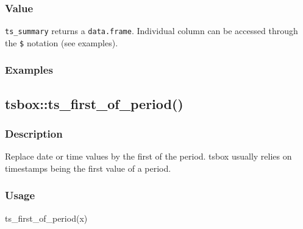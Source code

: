 \documentclass[
  letterpaper,
  DIV=11,
  numbers=noendperiod]{scrreport}
\newenvironment{Shaded}{\begin{snugshade}}{\end{snugshade}}
\newcommand{\AttributeTok}[1]{\textcolor[rgb]{0.40,0.45,0.13}{#1}}
\newcommand{\ConstantTok}[1]{\textcolor[rgb]{0.56,0.35,0.01}{#1}}
\newcommand{\DocumentationTok}[1]{\textcolor[rgb]{0.37,0.37,0.37}{\textit{#1}}}
\newcommand{\FunctionTok}[1]{\textcolor[rgb]{0.28,0.35,0.67}{#1}}
\newcommand{\NormalTok}[1]{\textcolor[rgb]{0.00,0.23,0.31}{#1}}
\newcommand{\SpecialCharTok}[1]{\textcolor[rgb]{0.37,0.37,0.37}{#1}}
\begin{document}
\subsubsection{Value}\label{value-8}

\texttt{ts\_summary} returns a \texttt{data.frame}. Individual column
can be accessed through the \texttt{\$} notation (see examples).

\subsubsection{Examples}\label{examples-8}

\begin{Shaded}
\end{Shaded}

\subsection{tsbox::ts\_first\_of\_period()}\label{tsboxts_first_of_period}

\subsubsection{Description}\label{description-9}

Replace date or time values by the first of the period. tsbox usually
relies on timestamps being the first value of a period.

\subsubsection{Usage}\label{usage-9}

\begin{Shaded}
\begin{Highlighting}[]
\FunctionTok{ts\_first\_of\_period}\NormalTok{(x)}
\end{Highlighting}
\end{Shaded}
\end{document}

